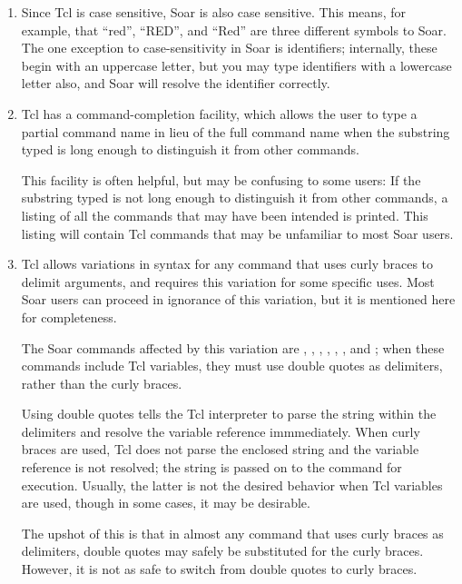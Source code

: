 {\begin{enumerate}
\item Since Tcl is case sensitive, Soar is also case sensitive. This means, 
	for example, that ``red'', ``RED'', and ``Red'' are three different
	symbols to Soar. The one exception to case-sensitivity in Soar is
	identifiers; internally, these begin with an uppercase letter, but you
	may type identifiers with a lowercase letter also, and Soar will
	resolve the identifier correctly.\vspace{-6pt}

\item Tcl has a command-completion facility, which allows the user to type a
	partial command name in lieu of the full command name when the
	substring typed is long enough to distinguish it from other commands.

        This facility is often helpful, but may be confusing to some users: If
	the substring typed is not long enough to distinguish it from other
	commands, a listing of all the commands that may have been intended is
	printed. This listing will contain Tcl commands that may be unfamiliar
	to most Soar users.\vspace{-6pt}

\item Tcl allows variations in syntax for any command that uses
	curly braces to delimit arguments, and requires this variation for
	some specific uses. Most Soar users can proceed in ignorance of this
	variation, but it is mentioned here for completeness.

	The Soar commands affected by this variation are , ,
	, , , , and
	; when these commands include Tcl variables,
	they must use double quotes as delimiters, rather than the curly
	braces.

	Using double quotes tells the Tcl interpreter to parse the string
	within the delimiters and resolve the variable reference immmediately.
	When curly braces are used, Tcl does not parse the enclosed string and
	the variable reference is not resolved; the string is passed on to the
	command for execution. Usually, the latter is not the desired
	behavior when Tcl variables are used, though in some cases, it may be
	desirable.

	The upshot of this is that in almost any command that uses curly
	braces as delimiters, double quotes may safely be substituted for the
	curly braces. However, it is not as safe to switch from double quotes
	to curly braces.
\end{enumerate}

}
